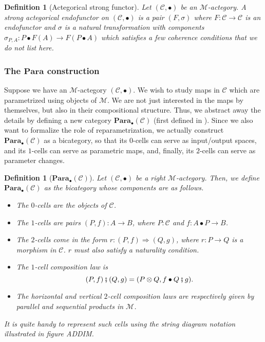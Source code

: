 \documentclass[12pt,a4paper,openright,twoside]{report}
\theoremstyle{plain}
\newtheorem{definition}[proposition]{Definition}
\theoremstyle{definition}
\begin{document}
\begin{definition}[Actegorical strong functor]
  Let $(\mathcal{C}, \bullet)$ be an $\mathcal{M}$-actegory. A strong actegorical endofunctor on $(\mathcal{C}, \bullet)$ is a pair $(F, \sigma)$ where $F: \mathcal{C} \to \mathcal{C}$ is an endofunctor and $\sigma$ is a natural transformation with components $\sigma_{P,A}: P \bullet F(A) \to F(P \bullet A)$ which satisfies a few coherence conditions that we do not list here.
\end{definition}



\subsubsection{The $\mathbf{Para}$ construction}


Suppose we have an $\mathcal{M}$-actegory $(\mathcal{C}, \bullet)$. We wish to study maps in $\mathcal{C}$ which are parametrized using objects of $\mathcal{M}$. We are not just interested in the maps by themselves, but also in their compositional structure. Thus, we abstract away the details by defining a new category $\mathbf{Para}_{\bullet}(\mathcal{C})$ (first defined in \cite{fong2019backprop}). Since we also want to formalize the role of reparametrization, we actually construct $\mathbf{Para}_{\bullet}(\mathcal{C})$ as a bicategory, so that its $0$-cells can serve as input/output spaces, and its $1$-cells can serve as parametric maps, and, finally, its $2$-cells can serve as parameter changes.

\begin{definition}[$\mathbf{Para}_{\bullet}(\mathcal{C})$]
  Let $(\mathcal{C}, \bullet)$ be a right $\mathcal{M}$-actegory. Then, we define $\mathbf{Para}_{\bullet}(\mathcal{C})$ as the bicategory whose components are as follows.
  \begin{itemize}
    \item The $0$-cells are the objects of $\mathcal{C}$.
    \item The $1$-cells are pairs $(P,f): A \to B$, where $P : \mathcal{C}$ and $f: A \bullet P \to B$.
    \item The $2$-cells come in the form $r: (P,f) \Rightarrow (Q,g)$, where $r: P \to Q$ is a morphism in $\mathcal{C}$. $r$ must also satisfy a naturality condition.
    \item The $1$-cell composition law is
    \[(P,f) \fatsemi (Q,g) = (P \otimes Q, f \bullet Q \fatsemi g).\]
    \item The horizontal and vertical $2$-cell composition laws are respectively given by parallel and sequential products in $\mathcal{M}$. 
  \end{itemize}
  It is quite handy to represent such cells using the string diagram notation illustrated in figure ADDIM.
\end{definition}
\end{document}
